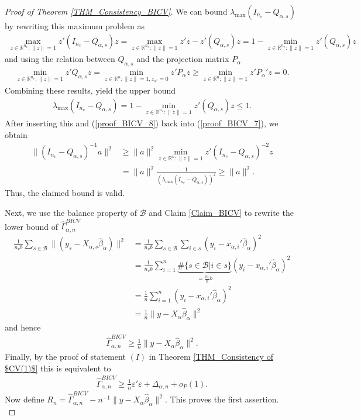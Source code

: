 \documentclass[Research_Module_ES.tex]{subfiles}
\begin{document}
\begin{proof}[Proof of Theorem \ref{THM_Consistency_BICV}]
	We can bound $\lambda_{\max}(I_{n_v}-Q_{\alpha,s})$ by rewriting this maximum problem as
	\begin{align*}
	\max_{z\in \mathbb{R}^{n_v} : \lVert z\rVert=1}z'(I_{n_v}-Q_{\alpha,s})z 
	= \max_{z\in \mathbb{R}^{n_v} : \lVert z\rVert=1}z'z - z'(Q_{\alpha,s})z 
	= 1- \min_{z\in \mathbb{R}^{n_v} : \lVert z\rVert=1}z'(Q_{\alpha,s})z 
	\end{align*}
	and using the relation between $Q_{\alpha,s}$ and the projection matrix $P_\alpha$
	\begin{align*}
	\min_{z\in \mathbb{R}^{n_v} : \lVert z\rVert=1}z'Q_{\alpha,s}z
	= \min_{z\in \mathbb{R}^n : \lVert z\rVert=1, z_{s^c}=0}z'P_\alpha z
	\ge \min_{z\in \mathbb{R}^n : \lVert z\rVert=1}z'P_\alpha'z = 0.
	\end{align*}
	Combining these results, yield the upper bound
	\begin{align*}
	\lambda_{\max}(I_{n_v}-Q_{\alpha,s})
	=1- \min_{z\in \mathbb{R}^{n_v} : \lVert z\rVert=1}z'(Q_{\alpha,s})z \le 1.
	\end{align*}
	After inserting this and (\ref{proof_BICV_8}) back into (\ref{proof_BICV_7}), we obtain
	\begin{align*}
	\lVert (I_{n_v}-Q_{\alpha,s})^{-1} a\rVert ^2 
	&\ge \lVert a\rVert^2 \min_{z\in \mathbb{R}^n : \lVert z\rVert=1}z'(I_{n_v}-Q_{\alpha,s})^{-2}z\\
	&=  \lVert a\rVert^2\frac{1}{(\lambda_{\max}(I_{n_v}-Q_{\alpha,s}))^2} 
	\ge \lVert a\rVert^2.
	\end{align*}
	Thus, the claimed bound is valid.
	
	Next, we use the balance property of $\mathcal{B}$ and Claim \ref{Claim_BICV} to rewrite the lower bound of $\hat{\Gamma}_{\alpha,n}^{BICV}$ 
	\begin{align*}
	\frac{1}{n_vb}\sum_{s\in \mathcal{B}}\lVert (y_s-X_{\alpha,s}\hat{\beta}_\alpha)\rVert^2
	&= \frac{1}{n_vb}\sum_{s\in \mathcal{B}}\sum_{i \in s} (y_i-x_{\alpha,i}'\hat{\beta}_\alpha)^2\\
	&= \frac{1}{n_vb}\sum_{i=1}^n \underbrace{\#\{s\in \mathcal{B}| i\in s\}}_{=\frac{n_v}{n}b} (y_i-x_{\alpha,i}'\hat{\beta}_\alpha)^2\\
	&=\frac{1}{n}\sum_{i=1}^n(y_i-x_{\alpha,i}'\hat{\beta}_\alpha)^2\\
	&= \frac{1}{n} \lVert y-X_\alpha\hat{\beta}_\alpha\rVert ^2
	\end{align*}
	and hence
	\begin{align*}
	\hat{\Gamma}_{\alpha,n}^{BICV} \ge \frac{1}{n} \lVert y-X_\alpha\hat{\beta}_\alpha\rVert ^2.
	\end{align*}
	Finally, by the proof of statement $(I)$ in Theorem \ref{THM_Consistency of $CV(1)$} this is equivalent to
	\begin{align*}
	\hat{\Gamma}_{\alpha,n}^{BICV} \ge \frac{1}{n}\varepsilon'\varepsilon + \Delta_{\alpha,n} + o_P(1).
	\end{align*}
	Now define $R_n = \hat{\Gamma}_{\alpha,n}^{BICV} - n^{-1}\lVert y-X_{\alpha}\hat{\beta}_\alpha\rVert^2$. This proves the first assertion.
	\\
	

\end{proof}
\end{document}
